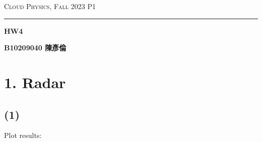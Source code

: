\documentclass{article}
\author{B10209040 陳彥倫}
\begin{document}
\thispagestyle{empty}
\hfill {\scshape \large Cloud Physics, Fall 2023 } \hfill {\scshape P1}
\smallskip
\hrule
\begin{CJK*}{UTF8}{bsmi}
\bigskip
\bigskip
\bigskip

\centerline{\huge \textbf {HW4}}
\bigskip
\centerline{\textbf {B10209040 陳彥倫}}

\section*{1. Radar}

\subsection*{(1)}
    \begin{large}
        Plot results:
        \begin{figure}[!htbp]
            \centering
\end{figure}
\end{large}
\end{CJK*}
\end{document}
